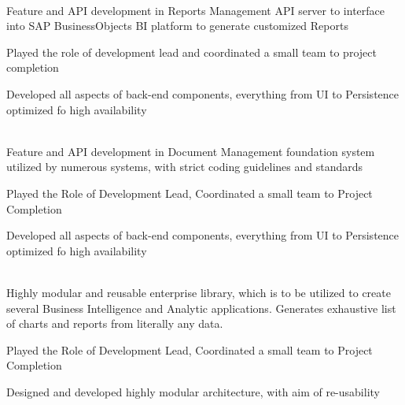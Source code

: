 \documentclass[]{resume}
\begin{document}

\clearpage

\hfill {}\\
Feature and API development in Reports Management API server to interface into SAP BusinessObjects BI platform to generate customized Reports\\
\begin{tightemize}
	\item Played the role of development lead and coordinated a small team to project completion
	\item Developed all aspects of back-end components, everything from UI to Persistence optimized fo high availability
\end{tightemize}
\sectionsep

\hfill {}\\
Feature and API development in Document Management foundation system utilized by numerous systems, with strict coding guidelines and standards\\
\begin{tightemize}
	\item Played the Role of Development Lead, Coordinated a small team to Project Completion
	\item Developed all aspects of back-end components, everything from UI to Persistence optimized fo high availability
\end{tightemize}
\sectionsep

\hfill {}\\
Highly modular and reusable enterprise library, which is to be utilized to create several Business Intelligence and Analytic applications. Generates exhaustive list of charts and reports from literally any data.\\
\begin{tightemize}
	\item Played the Role of Development Lead, Coordinated a small team to Project Completion
	\item Designed and developed highly modular architecture, with aim of re-usability
\end{tightemize}
\sectionsep
\end{document}
